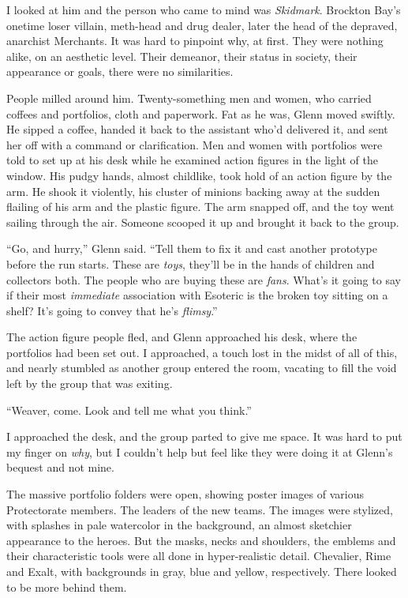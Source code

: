 I looked at him and the person who came to mind was \emph{Skidmark}.  Brockton Bay's onetime loser villain, meth-head and drug dealer, later the head of the depraved, anarchist Merchants.  It was hard to pinpoint why, at first.  They were nothing alike, on an aesthetic level.  Their demeanor, their status in society, their appearance or goals, there were no similarities.



People milled around him.  Twenty-something men and women, who carried coffees and portfolios, cloth and paperwork.  Fat as he was, Glenn moved swiftly.  He sipped a coffee, handed it back to the assistant who'd delivered it, and sent her off with a command or clarification.  Men and women with portfolios were told to set up at his desk while he examined action figures in the light of the window.  His pudgy hands, almost childlike, took hold of an action figure by the arm.  He shook it violently, his cluster of minions backing away at the sudden flailing of his arm and the plastic figure.  The arm snapped off, and the toy went sailing through the air.  Someone scooped it up and brought it back to the group.



``Go, and hurry,'' Glenn said.  ``Tell them to fix it and cast another prototype before the run starts.  These are \emph{toys}, they'll be in the hands of children and collectors both.  The people who are buying these are \emph{fans}.  What's it going to say if their most \emph{immediate} association with Esoteric is the broken toy sitting on a shelf?  It's going to convey that he's \emph{flimsy}.''



The action figure people fled, and Glenn approached his desk, where the portfolios had been set out.  I approached, a touch lost in the midst of all of this, and nearly stumbled as another group entered the room, vacating to fill the void left by the group that was exiting.



``Weaver, come.  Look and tell me what you think.''



I approached the desk, and the group parted to give me space.  It was hard to put my finger on \emph{why}, but I couldn't help but feel like they were doing it at Glenn's bequest and not mine.



The massive portfolio folders were open, showing poster images of various Protectorate members.  The leaders of the new teams.  The images were stylized, with splashes in pale watercolor in the background, an almost sketchier appearance to the heroes.  But the masks, necks and shoulders, the emblems and their characteristic tools were all done in hyper-realistic detail.  Chevalier, Rime and Exalt, with backgrounds in gray, blue and yellow, respectively.  There looked to be more behind them.



